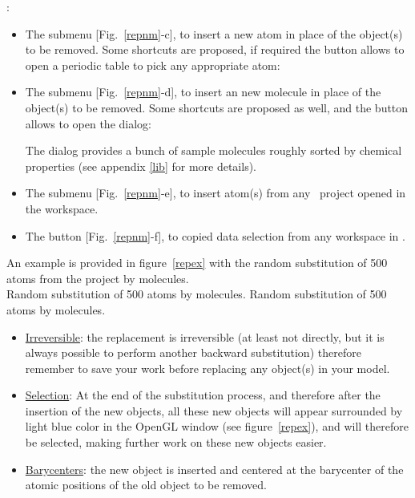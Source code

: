 :
\begin{itemize}
\item The  submenu [Fig.~\ref{repnm}-c], to insert a new atom in place of the object(s) to be removed. 
Some shortcuts are proposed, if required the  button allows to open a periodic table to pick any appropriate atom: 
\begin{center}\end{center}
\item The  submenu [Fig.~\ref{repnm}-d], to insert an new molecule in place of the object(s) to be removed. 
Some shortcuts are proposed as well, and the  button allows to open the  dialog:
\begin{center}\end{center}
The  dialog provides a bunch of sample molecules roughly sorted by chemical properties (see appendix \ref{lib} for more details).
\item The  submenu [Fig.~\ref{repnm}-e], to insert atom(s) from any \atomes\ project opened in the workspace. 
\item The  button [Fig.~\ref{repnm}-f], to copied data selection from any workspace in \atomes. 
\end{itemize}
\noindent An example is provided in figure~\ref{repex} with the random substitution of 500  atoms from the \aob{\sio} project by  molecules. \\ 
{Random substitution of 500  atoms by  molecules.}
{Random substitution of 500  atoms by  molecules.}
\clearpage
{}
\begin{itemize}
\item \uline{Irreversible}: the replacement is irreversible (at least not directly, but it is always possible to perform another backward substitution)
therefore remember to save your work before replacing any object(s) in your model. 
\item \uline{Selection}: At the end of the substitution process, and therefore after the insertion of the new objects, 
all these new objects will appear surrounded by light blue color in the OpenGL window (see figure~\ref{repex}), and will therefore be selected, 
making further work on these new objects easier.  
\item \uline{Barycenters}: the new object is inserted and centered at the barycenter of the atomic positions of the old object to be removed.
\end{itemize}

